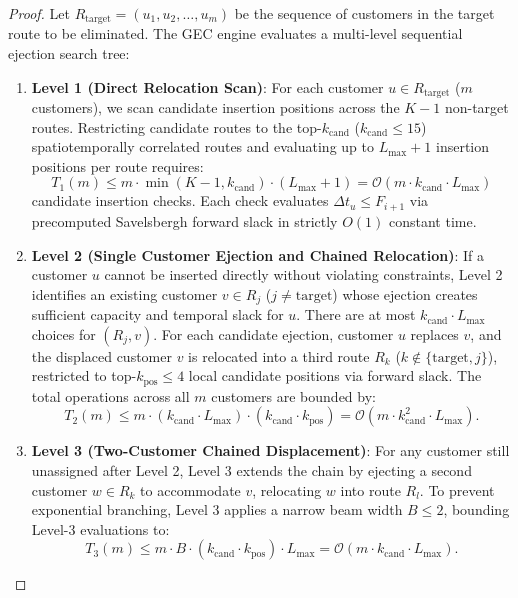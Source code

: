 \documentclass{article}
\begin{document}
\begin{proof}
Let $R_{\text{target}} = (u_1, u_2, \dots, u_m)$ be the sequence of customers in the target route to be eliminated. The GEC engine evaluates a multi-level sequential ejection search tree:
\begin{enumerate}
    \item \textbf{Level 1 (Direct Relocation Scan)}: For each customer $u \in R_{\text{target}}$ ($m$ customers), we scan candidate insertion positions across the $K-1$ non-target routes. Restricting candidate routes to the top-$k_{\text{cand}}$ ($k_{\text{cand}} \le 15$) spatiotemporally correlated routes and evaluating up to $L_{\max}+1$ insertion positions per route requires:
    \begin{equation}
    T_1(m) \le m \cdot \min(K-1, k_{\text{cand}}) \cdot (L_{\max} + 1) = \mathcal{O}(m \cdot k_{\text{cand}} \cdot L_{\max})
    \end{equation}
    candidate insertion checks. Each check evaluates $\Delta t_u \le F_{i+1}$ via precomputed Savelsbergh forward slack in strictly $O(1)$ constant time.
    \item \textbf{Level 2 (Single Customer Ejection and Chained Relocation)}: If a customer $u$ cannot be inserted directly without violating constraints, Level 2 identifies an existing customer $v \in R_j$ ($j \neq \text{target}$) whose ejection creates sufficient capacity and temporal slack for $u$. There are at most $k_{\text{cand}} \cdot L_{\max}$ choices for $(R_j, v)$. For each candidate ejection, customer $u$ replaces $v$, and the displaced customer $v$ is relocated into a third route $R_k$ ($k \notin \{\text{target}, j\}$), restricted to top-$k_{\text{pos}} \le 4$ local candidate positions via forward slack. The total operations across all $m$ customers are bounded by:
    \begin{equation}
    T_2(m) \le m \cdot (k_{\text{cand}} \cdot L_{\max}) \cdot (k_{\text{cand}} \cdot k_{\text{pos}}) = \mathcal{O}\left( m \cdot k_{\text{cand}}^2 \cdot L_{\max} \right).
    \end{equation}
    \item \textbf{Level 3 (Two-Customer Chained Displacement)}: For any customer still unassigned after Level 2, Level 3 extends the chain by ejecting a second customer $w \in R_k$ to accommodate $v$, relocating $w$ into route $R_l$. To prevent exponential branching, Level 3 applies a narrow beam width $B \le 2$, bounding Level-3 evaluations to:
    \begin{equation}
    T_3(m) \le m \cdot B \cdot (k_{\text{cand}} \cdot k_{\text{pos}}) \cdot L_{\max} = \mathcal{O}\left( m \cdot k_{\text{cand}} \cdot L_{\max} \right).

\end{equation}
\end{enumerate}
\end{proof}
\end{document}
